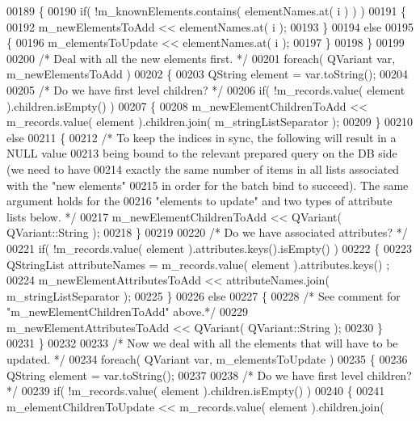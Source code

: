 \begin{DoxyCode}
00189   \{
00190     \textcolor{keywordflow}{if}( !m\_knownElements.contains( elementNames.at( i ) ) )
00191     \{
00192       m\_newElementsToAdd << elementNames.at( i );
00193     \}
00194     \textcolor{keywordflow}{else}
00195     \{
00196       m\_elementsToUpdate << elementNames.at( i );
00197     \}
00198   \}
00199 
00200   \textcolor{comment}{/* Deal with all the new elements first. */}
00201   \textcolor{keywordflow}{foreach}( QVariant var, m\_newElementsToAdd )
00202   \{
00203     QString element = var.toString();
00204 
00205     \textcolor{comment}{/* Do we have first level children? */}
00206     \textcolor{keywordflow}{if}( !m\_records.value( element ).children.isEmpty() )
00207     \{
00208       m\_newElementChildrenToAdd << m\_records.value( element ).children.join( 
      m\_stringListSeparator );
00209     \}
00210     \textcolor{keywordflow}{else}
00211     \{
00212       \textcolor{comment}{/* To keep the indices in sync, the following will result in a NULL value}
00213 \textcolor{comment}{        being bound to the relevant prepared query on the DB side (we need to
       have}
00214 \textcolor{comment}{        exactly the same number of items in all lists associated with the "new
       elements"}
00215 \textcolor{comment}{        in order for the batch bind to succeed). The same argument holds for
       the}
00216 \textcolor{comment}{        "elements to update" and two types of attribute lists below. */}
00217       m\_newElementChildrenToAdd << QVariant( QVariant::String );
00218     \}
00219 
00220     \textcolor{comment}{/* Do we have associated attributes? */}
00221     \textcolor{keywordflow}{if}( !m\_records.value( element ).attributes.keys().isEmpty() )
00222     \{
00223       QStringList attributeNames = m\_records.value( element ).attributes.keys()
      ;
00224       m\_newElementAttributesToAdd << attributeNames.join( m\_stringListSeparator
       );
00225     \}
00226     \textcolor{keywordflow}{else}
00227     \{
00228       \textcolor{comment}{/* See comment for "m\_newElementChildrenToAdd" above.*/}
00229       m\_newElementAttributesToAdd << QVariant( QVariant::String );
00230     \}
00231   \}
00232 
00233   \textcolor{comment}{/* Now we deal with all the elements that will have to be updated. */}
00234   \textcolor{keywordflow}{foreach}( QVariant var, m\_elementsToUpdate )
00235   \{
00236     QString element = var.toString();
00237 
00238     \textcolor{comment}{/* Do we have first level children? */}
00239     \textcolor{keywordflow}{if}( !m\_records.value( element ).children.isEmpty() )
00240     \{
00241       m\_elementChildrenToUpdate << m\_records.value( element ).children.join( 

\end{DoxyCode}
